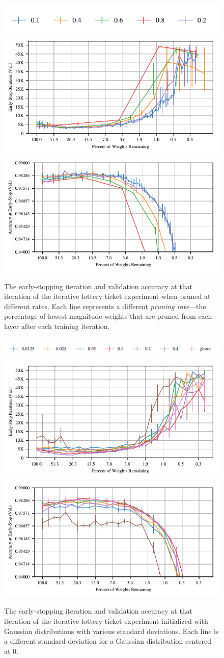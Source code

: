 \begin{figure}
\centering
\includegraphics[width=.5\textwidth]{graphs/mnist/lenet/pruning_rate_sweep/legend}
\includegraphics[width=.5\textwidth]{graphs/mnist/lenet/pruning_rate_sweep/iteration}%
\includegraphics[width=.5\textwidth]{graphs/mnist/lenet/pruning_rate_sweep/accuracy}
\caption{The early-stopping iteration and validation accuracy at that iteration of the iterative lottery ticket experiment when pruned at different rates. Each line
represents a different \emph{pruning rate}---the percentage of lowest-magnitude weights that are pruned from each layer after each training iteration.}
\label{fig:appendix-rate}
\end{figure}

\begin{figure}
\centering
\includegraphics[width=.5\textwidth]{graphs/mnist/lenet/normal_init_sweep/legend}
\includegraphics[width=.5\textwidth]{graphs/mnist/lenet/normal_init_sweep/iteration}%
\includegraphics[width=.5\textwidth]{graphs/mnist/lenet/normal_init_sweep/accuracy}
\caption{The early-stopping iteration and validation accuracy at that iteration of the iterative lottery ticket experiment initialized with Gaussian distributions
with various standard deviations. Each line is a different standard deviation for a Gaussian distribution centered at 0.}
\label{fig:appendix-normal}
\end{figure}

